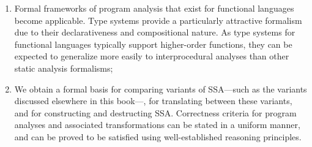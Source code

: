 {\begin{enumerate}
\item 
Formal frameworks of program analysis that exist for functional
languages become applicable. Type systems provide a particularly
attractive formalism due to their declarativeness and compositional
nature. As type systems for functional languages typically support
higher-order functions, they can be expected to generalize more easily
to interprocedural analyses than other static analysis formalisms;

\item  
  We obtain a formal basis for comparing variants of SSA---such as the variants
  discussed elsewhere in this book---, for translating between these
variants, and for constructing and destructing SSA.
Correctness criteria for program analyses and associated
transformations can be stated in a uniform manner, and can be proved
to be satisfied using well-established reasoning principles.

%

\end{enumerate}



}
